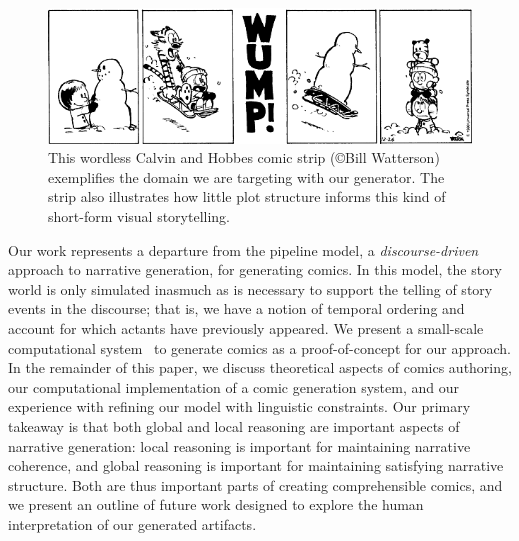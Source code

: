 \begin{figure}
\includegraphics[width=\columnwidth]{calvin-and-hobbes.png}
\caption{
This wordless Calvin and Hobbes comic strip (\copyright Bill Watterson)
exemplifies the domain we are targeting with our generator. The strip also
illustrates how little plot structure informs this kind of short-form visual
storytelling.
}
\label{fig:calvin}
\end{figure}

Our work represents a departure from the pipeline model, a
\emph{discourse-driven} approach to narrative generation, for generating
comics. In this model, the story world is only simulated inasmuch as is
necessary to support the telling of story events in the discourse; that is,
we have a notion of temporal ordering and account for which actants have
previously appeared. We present a small-scale computational
system~\cite{montfort2012small} to generate comics as a proof-of-concept
for our approach.
%
In the remainder of this paper, we discuss theoretical aspects of comics
authoring, our computational implementation of a comic generation system,
and our experience with refining our model with linguistic constraints. Our
primary takeaway is that both global and local reasoning are important
aspects of narrative generation: local reasoning is important for
maintaining narrative coherence, and global reasoning is important for
maintaining satisfying narrative structure. Both are thus important parts
of creating comprehensible comics, and we present an outline of future work
designed to explore the human interpretation of our generated artifacts.

